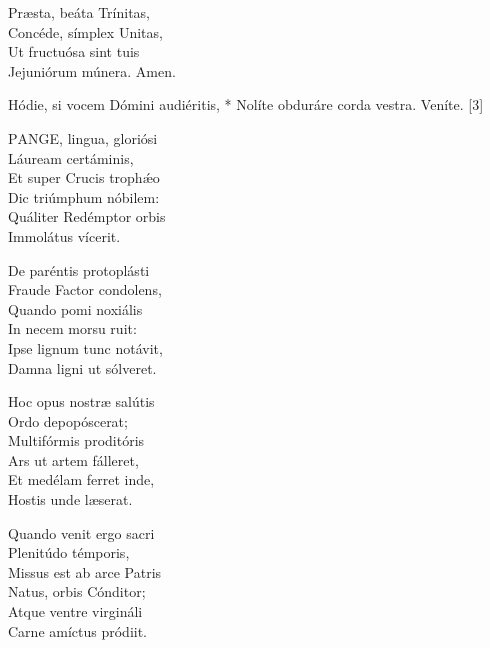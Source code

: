 
Præsta, beáta Trínitas,\\
Concéde, símplex Unitas,\\
Ut fructuósa sint tuis\\
Jejuniórum múnera. Amen.



 Hódie, si vocem Dómini audiéritis, * Nolíte obduráre corda vestra.  Veníte. [3]




\lettrine[lines=2]{P}{ANGE}, lingua, gloriósi\\
Láuream certáminis,\\
Et super Crucis trophǽo\\
Dic triúmphum nóbilem:\\
Quáliter Redémptor orbis\\
Immolátus vícerit.

De paréntis protoplásti\\
Fraude Factor condolens,\\
Quando pomi noxiális\\
In necem morsu ruit:\\
Ipse lignum tunc notávit,\\
Damna ligni ut sólveret.

Hoc opus nostræ salútis\\
Ordo depopóscerat;\\
Multifórmis proditóris\\
Ars ut artem fálleret,\\
Et medélam ferret inde,\\
Hostis unde læserat.

Quando venit ergo sacri\\
Plenitúdo témporis,\\
Missus est ab arce Patris\\
Natus, orbis Cónditor;\\
Atque ventre virgináli\\
Carne amíctus pródiit.

